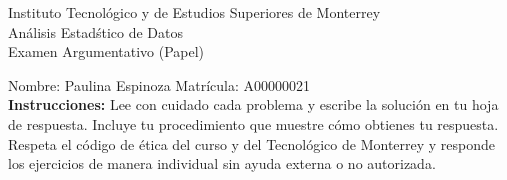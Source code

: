 \documentclass[10pt]{report}
\begin{document}
\newpage



\begin{center}
{\large Instituto Tecnol\'{o}gico y de Estudios Superiores de Monterrey \\
An\'alisis Estad\'stico de Datos } \\
Examen Argumentativo (Papel)
\end{center}

Nombre: \underline{\hspace*{.2in}}
Paulina Espinoza
\underline{\hspace*{.2in}} \quad Matr\'icula:\underline{\hspace*{.2in}}
A00000021
\underline{\hspace*{.2in}} \\

{\bf Instrucciones:} Lee con cuidado cada problema y escribe la soluci\'on
en tu hoja de respuesta. Incluye tu procedimiento que muestre c\'omo obtienes tu respuesta.  Respeta el c\'odigo de \'etica del curso y del Tecnol\'ogico de Monterrey y responde los ejercicios de manera individual sin ayuda externa o no autorizada.
\end{document}
